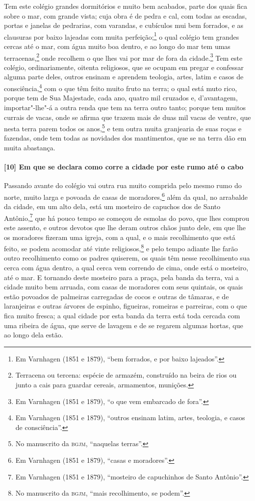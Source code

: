 Tem este colégio grandes dormitórios e muito bem acabados, parte dos quais fica sobre o
mar, com grande vista; cuja obra é de pedra e cal, com todas as escadas, portas e janelas
de pedrarias, com varandas, e cubículos mui bem forrados, e as clausuras por baixo
lajeadas com muita perfeição;\footnote{ Em Varnhagen (1851 e 1879), ``bem forrados, e por
baixo lajeados''.} o qual colégio tem grandes cercas até o mar, com água muito boa dentro,
e ao longo do mar tem umas terracenas,\footnote{ Terracena ou tercena: espécie de armazém,
construído na beira de rios ou junto a cais para guardar cereais, armamentos, munições.}
onde recolhem o que lhes vai por mar de fora da cidade.\footnote{ Em Varnhagen (1851 e
1879), ``o que vem embarcado de fora''.} Tem este colégio, ordinariamente, oitenta
religiosos, que se ocupam em pregar e confessar alguma parte deles, outros ensinam e
aprendem teologia, artes, latim e casos de consciência,\footnote{ Em Varnhagen (1851 e
1879), ``outros ensinam latim, artes, teologia, e casos de consciência''.} com o que têm
feito muito fruto na terra; o qual está muto rico, porque tem de Sua Majestade, cada ano,
quatro mil cruzados e, d'avantagem, importar"-lhe"-á a outra renda que tem na terra outro
tanto; porque tem muitos currais de vacas, onde se afirma que trazem mais de duas mil
vacas de ventre, que nesta terra parem todos os anos,\footnote{ No manuscrito da
\textsc{bgjm}, ``naquelas terras''.} e tem outra muita granjearia de suas roças e
fazendas, onde tem todas as novidades dos mantimentos, que se na terra dão em muita
abastança.

\paragraph{[10] Em que se declara como corre a cidade por este rumo até o cabo} \quad
Passando avante do colégio vai outra rua muito comprida pelo mesmo rumo do norte, muito
larga e povoada de casas de moradores,\footnote{ Em Varnhagen (1851 e 1879), ``casas e
moradores''.} além da qual, no arrabalde da cidade, em um alto dela, está um mosteiro de
capuchos dos de Santo Antônio,\footnote{ Em Varnhagen (1851 e 1879), ``mosteiro de
capuchinhos de Santo Antônio''.} que há pouco tempo se começou de esmolas do povo, que
lhes comprou este assento, e outros devotos que lhe deram outros chãos junto dele, em que
lhe os moradores fizeram uma igreja, com a qual, e o mais recolhimento que está feito, se
podem acomodar até vinte religiosos,\footnote{ No manuscrito da \textsc{bgjm}, ``mais
recolhimento, se podem''.} e pelo tempo adiante lhe farão outro recolhimento como os
padres quiserem, os quais têm nesse recolhimento sua cerca com água dentro, a qual cerca
vem correndo de cima, onde está o mosteiro, até o mar. E tornando deste mosteiro para a
praça, pela banda da terra, vai a cidade muito bem arruada, com casas de moradores com
seus quintais, os quais estão povoados de palmeiras carregadas de cocos e outras de
tâmaras, e de laranjeiras e outras árvores de espinho, figueiras, romeiras e parreiras,
com o que fica muito fresca; a qual cidade por esta banda da terra está toda cercada com
uma ribeira de água, que serve de lavagem e de se regarem algumas hortas, que ao longo
dela estão.

